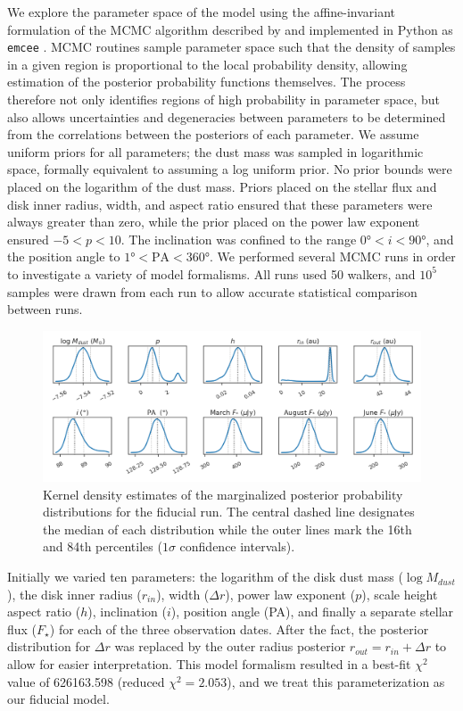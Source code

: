 \documentclass[12pt,oneside]{book}
\begin{document}
We explore the parameter space of the model using the affine-invariant formulation of the MCMC algorithm described by \cite{goodmanweare10} and implemented in Python as \texttt{emcee} \citep{foreman-mackey13}.  
MCMC routines sample parameter space such that the density of samples in a given region is proportional to the local probability density, allowing estimation of the posterior probability functions themselves.
The process therefore not only identifies regions of high probability in parameter space, but also allows uncertainties and degeneracies between parameters to be determined from the correlations between the posteriors of each parameter. 
We assume uniform priors for all parameters; the dust mass was sampled in logarithmic space, formally equivalent to assuming a log uniform prior.
No prior bounds were placed on the logarithm of the dust mass.
Priors placed on the stellar flux and disk inner radius, width, and aspect ratio ensured that these parameters were always greater than zero, while the prior placed on the power law exponent ensured $-5 < p < 10$.
The inclination was confined to the range $\ang{0} < i < \ang{90}$, and the position angle to $\ang{1} < \text{PA} < \ang{360}$.
We performed several MCMC runs in order to investigate a variety of model formalisms. 
All runs used 50 walkers, and $10^5$ samples were drawn from each run to allow accurate statistical comparison between runs.


\begin{figure}
  \centering
  \includegraphics[width=\linewidth]{../figures/fiducial_kde}
  \caption{Kernel density estimates of the marginalized posterior probability distributions for the fiducial run. The central dashed line designates the median of each distribution while the outer lines mark the 16th and 84th percentiles ($1\sigma$ confidence intervals).}
  \label{fig: kde}
\end{figure}

Initially we varied ten parameters: the logarithm of the disk dust mass \linebreak ($\log M_{dust}$), the disk inner radius ($r_{in}$), width ($\Delta r$), power law exponent ($p$), scale height aspect ratio ($h$), inclination ($i$), position angle (PA), and finally a separate stellar flux ($F_\star$) for each of the three observation dates. 
After the fact, the posterior distribution for $\Delta r$ was replaced by the outer radius posterior $r_{out} = r_{in} + \Delta r$ to allow for easier interpretation.
This model formalism resulted in a best-fit $\chi^2$ value of 626163.598 (reduced $\chi^2=2.053$), and we treat this parameterization as our fiducial model.
\end{document}
